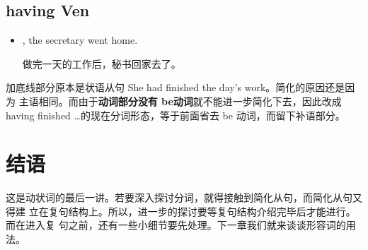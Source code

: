 \subsection{having Ven}

\begin{itemize}
\item {}, the secretary went home.

  做完一天的工作后，秘书回家去了。
\end{itemize}

加底线部分原本是状语从句 She had finished the day's work。简化的原因还是因为
主语相同。而由于\textbf{动词部分没有 be动词}就不能进一步简化下去，因此改成 having
finished \ldots{}的现在分词形态，等于前面省去 be 动词，而留下补语部分。

\section{结语}

这是动状词的最后一讲。若要深入探讨分词，就得接触到简化从句，而简化从句又得建
立在复句结构上。所以，进一步的探讨要等复句结构介绍完毕后才能进行。而在进入复
句之前，还有一些小细节要先处理。下一章我们就来谈谈形容词的用法。
